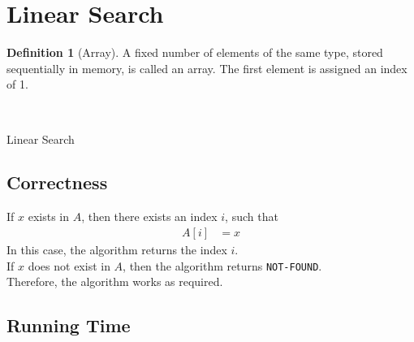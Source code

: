 \documentclass[titlepage, fleqn, a4paper, 12pt, twoside]{article}
\theoremstyle{definition}
\newtheorem{definition}{Definition}
\theoremstyle{theorem}
\let\And\relax
\begin{document}
\section{Linear Search}

\begin{definition}[Array]
	A fixed number of elements of the same type, stored sequentially in memory, is called an array.
	The first element is assigned an index of 1.
	\begin{figure}[H]
		\begin{bytefield}[bitwidth = 3em, lsb=1]{9}
			\\
		\end{bytefield}
	\end{figure}
\end{definition}

\begin{algorithm}[H]
	\begin{algorithmic}[1]
		\Statex
		\While{$\texttt{found} = \False \And i \le n$}
			\Else
			\EndIf
		\EndWhile
		\Else
		\EndIf
	\end{algorithmic}
	\caption{Linear Search}
	\label{alg:Linear_Search}
\end{algorithm}

\subsection{Correctness}

If $x$ exists in $A$, then there exists an index $i$, such that
\begin{align*}
	A[i] & = x
\end{align*}
In this case, the algorithm returns the index $i$.\\
If $x$ does not exist in $A$, then the algorithm returns \texttt{NOT-FOUND}.\\
Therefore, the algorithm works as required.

\subsection{Running Time}
\end{document}
